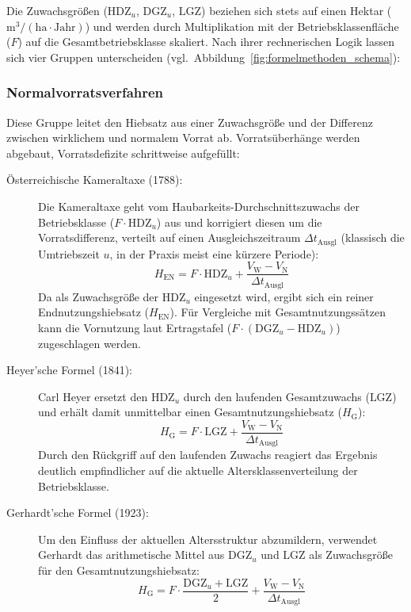 \documentclass[twocolumn, paper=a4, fontsize=10pt]{scrartcl}
\begin{document}
Die Zuwachsgrößen ($\text{HDZ}_u$, $\text{DGZ}_u$, $\text{LGZ}$) beziehen sich stets auf einen Hektar ($\text{m}^3/(\text{ha}\cdot\text{Jahr})$) und werden durch Multiplikation mit der Betriebsklassenfläche ($F$) auf die Gesamtbetriebsklasse skaliert. Nach ihrer rechnerischen Logik lassen sich vier Gruppen unterscheiden (vgl.\ Abbildung~\ref{fig:formelmethoden_schema}):

\subsubsection{Normalvorratsverfahren}

Diese Gruppe leitet den Hiebsatz aus einer Zuwachsgröße und der Differenz zwischen wirklichem und normalem Vorrat ab. Vorratsüberhänge werden abgebaut, Vorratsdefizite schrittweise aufgefüllt:

\begin{description}
\item[Österreichische Kameraltaxe (1788):] Die Kameraltaxe geht vom Haubarkeits-Durchschnittszuwachs der Betriebsklasse ($F \cdot \text{HDZ}_u$) aus und korrigiert diesen um die Vorratsdifferenz, verteilt auf einen Ausgleichszeitraum $\Delta t_{\text{Ausgl}}$ (klassisch die Umtriebszeit $u$, in der Praxis meist eine kürzere Periode):
\begin{equation}
H_{\text{EN}} = F \cdot \text{HDZ}_u + \frac{V_{\text{W}} - V_{\text{N}}}{\Delta t_{\text{Ausgl}}}
\end{equation}
Da als Zuwachsgröße der $\text{HDZ}_u$ eingesetzt wird, ergibt sich ein reiner Endnutzungshiebsatz ($H_{\text{EN}}$). Für Vergleiche mit Gesamtnutzungssätzen kann die Vornutzung laut Ertragstafel ($F \cdot (\text{DGZ}_u - \text{HDZ}_u)$) zugeschlagen werden.

\item[Heyer'sche Formel (1841):] Carl Heyer ersetzt den $\text{HDZ}_u$ durch den laufenden Gesamtzuwachs ($\text{LGZ}$) und erhält damit unmittelbar einen Gesamtnutzungshiebsatz ($H_{\text{G}}$):
\begin{equation}
H_{\text{G}} = F \cdot \text{LGZ} + \frac{V_{\text{W}} - V_{\text{N}}}{\Delta t_{\text{Ausgl}}}
\end{equation}
Durch den Rückgriff auf den laufenden Zuwachs reagiert das Ergebnis deutlich empfindlicher auf die aktuelle Altersklassenverteilung der Betriebsklasse.

\item[Gerhardt'sche Formel (1923):] Um den Einfluss der aktuellen Altersstruktur abzumildern, verwendet Gerhardt das arithmetische Mittel aus $\text{DGZ}_u$ und $\text{LGZ}$ als Zuwachsgröße für den Gesamtnutzungshiebsatz:
\begin{equation}
H_{\text{G}} = F \cdot \frac{\text{DGZ}_u + \text{LGZ}}{2} + \frac{V_{\text{W}} - V_{\text{N}}}{\Delta t_{\text{Ausgl}}}
\end{equation}
\end{description}
\end{document}
